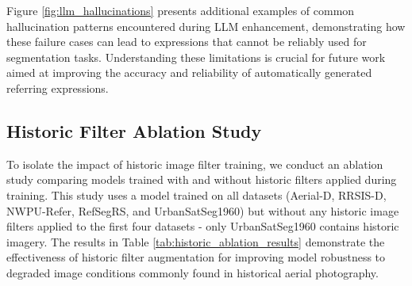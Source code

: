 Figure \ref{fig:llm_hallucinations} presents additional examples of common hallucination patterns encountered during LLM enhancement, demonstrating how these failure cases can lead to expressions that cannot be reliably used for segmentation tasks. Understanding these limitations is crucial for future work aimed at improving the accuracy and reliability of automatically generated referring expressions.

\begin{figure*}[t]
\centering
\caption{Representative examples of LLM hallucination failure cases during expression enhancement. Original rule-based expressions (left) are enhanced into inaccurate descriptions (right) that reference visual elements not present in the actual imagery, highlighting the need for quality control measures in automated dataset generation.}
\label{fig:llm_hallucinations}
\end{figure*}

\subsection{Historic Filter Ablation Study}
\label{subsec:historic_ablation}

To isolate the impact of historic image filter training, we conduct an ablation study comparing models trained with and without historic filters applied during training. This study uses a model trained on all datasets (Aerial-D, RRSIS-D, NWPU-Refer, RefSegRS, and UrbanSatSeg1960) but without any historic image filters applied to the first four datasets - only UrbanSatSeg1960 contains historic imagery. The results in Table \ref{tab:historic_ablation_results} demonstrate the effectiveness of historic filter augmentation for improving model robustness to degraded image conditions commonly found in historical aerial photography.

